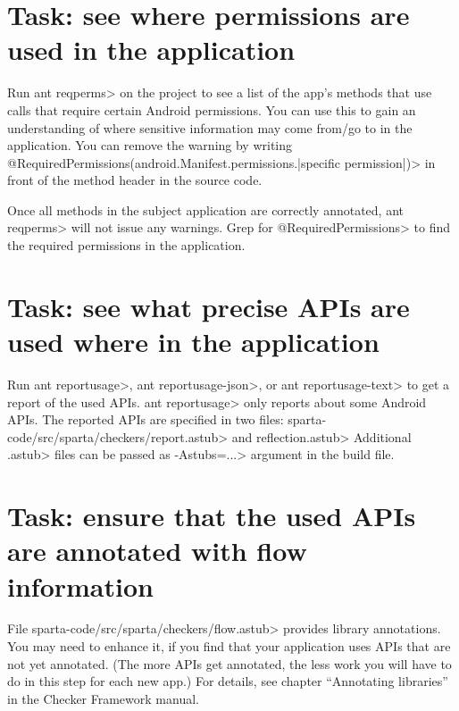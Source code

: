 \section{Task: see where permissions are used in the application}

Run \<ant reqperms> on the project to see a list of the app's methods
that use calls that require certain Android permissions. You can use
this to gain an understanding of where sensitive information may come
from/go to in the application. You can remove the warning by writing
\<@RequiredPermissions({android.Manifest.permissions.|specific
permission|})> in front of the method header in the source code.

Once all methods in the subject application are correctly annotated,
\<ant reqperms> will not issue any warnings.
Grep for \<@RequiredPermissions> to find the required permissions
in the application.





\section{Task: see what precise APIs are used where in the application}

Run \<ant reportusage>, \<ant reportusage-json>, or \<ant
reportusage-text> to get a report of the used APIs.
\<ant reportusage> only reports about some Android APIs.
The reported APIs are specified in two files:
\<sparta-code/src/sparta/checkers/report.astub> and \<reflection.astub>
Additional \<.astub> files can be passed as \<-Astubs=...> argument in the
build file.


\section{Task: ensure that the used APIs are annotated with flow information\label{flow-task-annotate-apis}}

File \<sparta-code/src/sparta/checkers/flow.astub> provides library
annotations.  You may need to enhance it, if you find that your application
uses APIs that are not yet annotated.
(The  more APIs get annotated, the less work you will have to do in this
step for each new app.)
For details, see chapter
``Annotating libraries'' in the Checker Framework manual.

